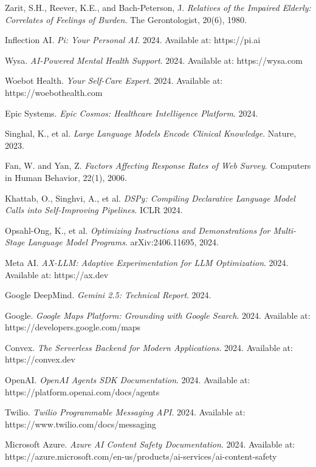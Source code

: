 \documentclass{article}
\begin{document}
\begin{thebibliography}{99}
Zarit, S.H., Reever, K.E., and Bach-Peterson, J.
\textit{Relatives of the Impaired Elderly: Correlates of Feelings of Burden}.
The Gerontologist, 20(6), 1980.

Inflection AI.
\textit{Pi: Your Personal AI}.
2024. Available at: https://pi.ai

Wysa.
\textit{AI-Powered Mental Health Support}.
2024. Available at: https://wysa.com

Woebot Health.
\textit{Your Self-Care Expert}.
2024. Available at: https://woebothealth.com

Epic Systems.
\textit{Epic Cosmos: Healthcare Intelligence Platform}.
2024.

Singhal, K., et al.
\textit{Large Language Models Encode Clinical Knowledge}.
Nature, 2023.

Fan, W. and Yan, Z.
\textit{Factors Affecting Response Rates of Web Survey}.
Computers in Human Behavior, 22(1), 2006.

Khattab, O., Singhvi, A., et al.
\textit{DSPy: Compiling Declarative Language Model Calls into Self-Improving Pipelines}.
ICLR 2024.

Opsahl-Ong, K., et al.
\textit{Optimizing Instructions and Demonstrations for Multi-Stage Language Model Programs}.
arXiv:2406.11695, 2024.

Meta AI.
\textit{AX-LLM: Adaptive Experimentation for LLM Optimization}.
2024. Available at: https://ax.dev

Google DeepMind.
\textit{Gemini 2.5: Technical Report}.
2024.

Google.
\textit{Google Maps Platform: Grounding with Google Search}.
2024. Available at: https://developers.google.com/maps

Convex.
\textit{The Serverless Backend for Modern Applications}.
2024. Available at: https://convex.dev

OpenAI.
\textit{OpenAI Agents SDK Documentation}.
2024. Available at: https://platform.openai.com/docs/agents

Twilio.
\textit{Twilio Programmable Messaging API}.
2024. Available at: https://www.twilio.com/docs/messaging

Microsoft Azure.
\textit{Azure AI Content Safety Documentation}.
2024. Available at: https://azure.microsoft.com/en-us/products/ai-services/ai-content-safety


\end{thebibliography}
\end{document}
